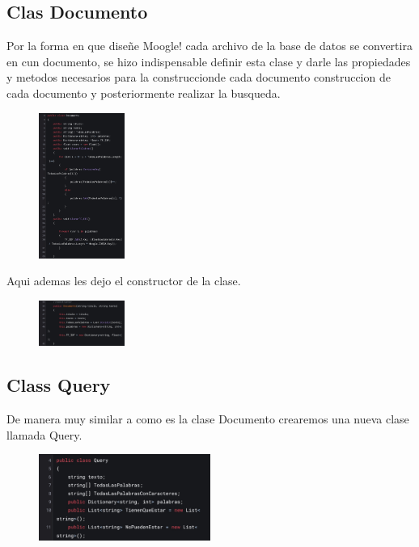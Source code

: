 \documentclass[a4paper,12pt]{article}
\begin{document}
\subsection{Clas Documento}\label{sub:Documento}

  Por la forma en que diseñe Moogle! cada archivo de la base de datos se convertira en cun documento, se hizo indispensable
definir esta clase y darle las propiedades y metodos necesarios para la construccionde cada documento construccion de cada documento y posteriormente 
realizar la busqueda.

\begin{figure}[H]
    \centering
    \includegraphics[width=0.25\textwidth]{imagenes/2.jpg}
\end{figure}

  Aqui ademas les dejo el constructor de la clase.

 \begin{figure}[H]
    \centering
    \includegraphics[width=0.25\textwidth]{imagenes/3.jpg}
\end{figure}

\subsection{Class Query}\label{sub:Query}

De manera muy similar a como es la clase Documento crearemos una nueva clase llamada Query.

\begin{figure}[H]
    \centering
    \includegraphics[width=0.5\textwidth]{imagenes/8.q.jpg}
\end{figure}
\end{document}
